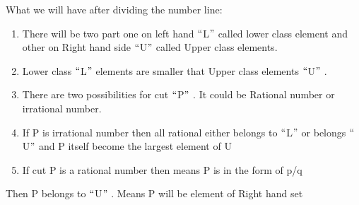 \documentclass[12pt]{article}
\renewcommand{\_}{\kern-1.5pt\textunderscore\kern-1.5pt}
\begin{document}

\par


\vspace{\baselineskip}
\begin{FlushLeft}
{\fontsize{14pt}{16.8pt}\selectfont What we will have after dividing the number line:\par}
\end{FlushLeft}\par

\begin{enumerate}
	\item {\fontsize{14pt}{16.8pt}\selectfont There will be two part one on left hand $``$L$"$  called lower class element and other on Right hand side $``$U$"$  called Upper class elements.\par}\par

	\item {\fontsize{14pt}{16.8pt}\selectfont Lower class $``$L$"$  elements are smaller that Upper class elements $``$U$"$ .\par}\par

	\item {\fontsize{14pt}{16.8pt}\selectfont There are two possibilities for cut $``$P$"$ . It could be Rational number or irrational number.\par}\par

	\item {\fontsize{14pt}{16.8pt}\selectfont If P is irrational number then all rational either belongs to $``$L$"$  or belongs $``$U$"$  and P itself become the largest element of U\par}\par

	\item {\fontsize{14pt}{16.8pt}\selectfont If cut P is a rational number then means P is in the form of p/q\par}
\end{enumerate}\par

\begin{adjustwidth}{0.5in}{0.0in}
\begin{FlushLeft}
{\fontsize{14pt}{16.8pt}\selectfont Then P belongs to $``$U$"$ . Means P will be element of Right hand set\par}
\end{FlushLeft}\par

\end{adjustwidth}
\end{document}

